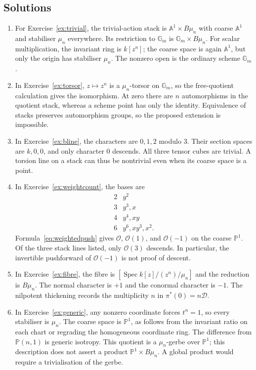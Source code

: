 \documentclass[11pt,a4paper]{article}
\numberwithin{equation}{section}
\theoremstyle{definition}
\newcommand{\A}{\mathbb A}
\newcommand{\PP}{\mathbb P}
\newcommand{\Gm}{\mathbb G_m}
\newcommand{\OO}{\mathcal O}
\newcommand{\cD}{\mathcal D}
\newcommand{\Spec}{\operatorname{Spec}}
\begin{document}
\subsection*{Solutions}
\begin{enumerate}[label=\textbf{\arabic*.},leftmargin=*]
\item For Exercise~\ref{ex:trivial}, the trivial-action stack is
$\A^1\times B\mu_n$ with coarse $\A^1$ and stabiliser $\mu_n$
everywhere. Its restriction to $\Gm$ is $\Gm\times B\mu_n$.
For scalar multiplication, the invariant ring is $k[z^n]$; the coarse
space is again $\A^1$, but only the origin has stabiliser $\mu_n$.
The nonzero open is the ordinary scheme $\Gm$.

\item In Exercise~\ref{ex:torsor}, $z\mapsto z^n$ is a $\mu_n$-torsor on
$\Gm$, so the free-quotient calculation gives the isomorphism.
At zero there are $n$ automorphisms in the quotient stack, whereas a
scheme point has only the identity. Equivalence of stacks preserves
automorphism groups, so the proposed extension is impossible.

\item In Exercise~\ref{ex:bline}, the characters are $0,1,2$ modulo $3$.
Their section spaces are $k,0,0$, and only character $0$ descends.
All three tensor cubes are trivial. A torsion line on a stack can thus
be nontrivial even when its coarse space is a point.

\item In Exercise~\ref{ex:weightcount}, the bases are
\[
 \begin{array}{c|l}
 2&y^2\\
 3&y^3,x\\
 4&y^4,xy\\
 6&y^6,xy^3,x^2.
 \end{array}
\]
Formula~\eqref{eq:weightedpush} gives $\OO$, $\OO(1)$, and
$\OO(-1)$ on the coarse $\PP^1$. Of the three stack lines listed,
only $\OO(3)$ descends. In particular, the invertible pushforward of
$\OO(-1)$ is not proof of descent.

\item In Exercise~\ref{ex:fibre}, the fibre is
$[\Spec k[z]/(z^n)/\mu_n]$ and the reduction is $B\mu_n$.
The normal character is $+1$ and the conormal character is $-1$.
The nilpotent thickening records the multiplicity $n$ in
$\pi^*(0)=n\cD$.

\item In Exercise~\ref{ex:generic}, any nonzero coordinate forces
$t^n=1$, so every stabiliser is $\mu_n$. The coarse space is $\PP^1$,
as follows from the invariant ratio on each chart or regrading the
homogeneous coordinate ring. The difference from $\PP(n,1)$ is generic
isotropy. This quotient is a $\mu_n$-gerbe over $\PP^1$; this description
does not assert a product $\PP^1\times B\mu_n$. A global product
would require a trivialisation of the gerbe.


\end{enumerate}
\end{document}
